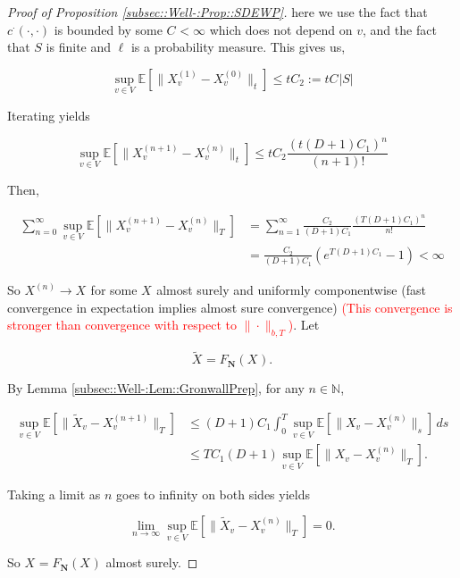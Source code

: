 \documentclass[12pt]{article}
\newcommand{\mb}{\mathbb}
\newcommand{\ra}{\rightarrow}
\newcommand{\tr}{\textcolor{red}}
\newcommand{\ex}[1]{\mb{E}\left[#1\right]}			%
\newcommand{\defeq}{:=}								%
\renewcommand{\v}{v}							%
\renewcommand{\S}{S}							%
\renewcommand{\b}{b}							%
\newcommand{\T}{T}								%
\renewcommand{\t}{t}							%
\renewcommand{\tt}{s}							%
\newcommand{\X}{X}								%
\newcommand{\IGr}{c}							%
\newcommand{\vind}[1]{^{#1}}					%
\newcommand{\cind}[1]{_{#1}}					%
\newcommand{\tip}[1]{#1}						%
\newcommand{\const}{C}							%
\newcommand{\degr}{D}							%
\newcommand{\sln}[1]{^{(#1)}}						%
\newcommand{\poisses}{\mathbf{N}}				%
\newcommand{\Sm}{\ell}							%
\newcommand{\Fpo}{F_{\poisses}}					%
\newcommand{\alt}[1]{\widetilde{#1}}			%
\newcommand{\indx}[1]{_{#1}}					%
\begin{document}
\begin{proof}[Proof of Proposition \ref{subsec::Well-:Prop::SDEWP}]
here we use the fact that \(\IGr\vind{\cdot}(\cdot,\cdot)\) is bounded by some \(\const\indx{} < \infty\) which does not depend on \(\v\), and the fact that \(\S\) is finite and \(\Sm\) is a probability measure. This gives us,

\[\sup_{\v \in V}\ex{\|\X\sln{1}\cind{\v}\tip{} - \X\sln{0}\cind{\v}\tip{}\|_\t} \leq \t\const\indx{2} \defeq \t\const\indx{}|\S|\]

Iterating yields

\[\sup_{\v \in V} \ex{\|\X\sln{n+1}\cind{\v}\tip{} - \X\sln{n}\cind{\v}\tip{}\|_\t} \leq \t\const\indx{2}\frac{(\t(\degr+1)\const\indx{1})^n}{(n+1)!}\]

Then,

\begin{align*}
\sum_{n=0}^\infty \sup_{\v \in V} \ex{\|\X\sln{n+1}\cind{\v}\tip{} - \X\sln{n}\cind{\v}\tip{}\|_\T} &= \sum_{n=1}^\infty \frac{\const\indx{2}}{(\degr+1)\const\indx{1}}\frac{(\T(\degr+1)\const\indx{1})^{n}}{n !}\\
& = \frac{\const\indx{2}}{(\degr+1)\const\indx{1}}(e^{\T(\degr+1)\const\indx{1}} - 1) < \infty
\end{align*}


So \(\X\sln{n}\cind{}\tip{} \ra \X\cind{}\tip{}\) for some \(\X\cind{}\tip{}\) almost surely and uniformly componentwise (fast convergence in expectation implies almost sure convergence) \tr{(This convergence is stronger than convergence with respect to \(\|\cdot\|_{\b,\T}\))}. Let 

\[\alt{\X}\cind{}\tip{} = \Fpo(\X\cind{}\tip{}).\]

By Lemma \ref{subsec::Well-:Lem::GronwallPrep}, for any \(n\in\mb{N}\),

\begin{align*}
\sup_{\v \in V} \ex{\|\alt{\X}\cind{\v}\tip{} - \X\sln{n+1}\cind{\v}\tip{}\|_\T} &\leq (\degr+1)\const\indx{1}\int_0^\T \sup_{\v \in V}\ex{\|\X\cind{\v}\tip{} - \X\sln{n}\cind{\v}\tip{}\|_\tt}\,d\tt \\
&\leq \T\const\indx{1}(\degr+1)\sup_{\v\in V} \ex{\|\X\cind{\v}\tip{} - \X\sln{n}\cind{\v}\tip{}\|_\T}.
\end{align*}

Taking a limit as \(n\) goes to infinity on both sides yields

\[\lim_{n\ra\infty} \sup_{\v \in V} \ex{\|\alt{\X}\cind{\v}\tip{} - \X\sln{n}\cind{\v}\tip{}\|_\T} = 0.\]

So \(\X\cind{}\tip{}= \Fpo(\X\cind{}\tip{})\) almost surely.
\end{proof}
\end{document}
